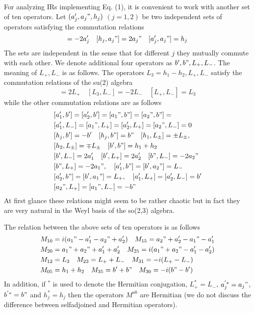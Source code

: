 \documentclass[a4paper,12pt]{article}%
\begin{document}
For analyzing IRs implementing Eq. (1), it is convenient to
work with another set of ten operators. Let $(a_j',a_j",h_j)$ 
$(j=1,2)$ be two independent sets of operators satisfying the 
commutation relations 
\begin{equation}
[h_j,a_j']=-2a_j'\quad [h_j,a_j"]=2a_j"\quad [a_j',a_j"]=h_j
\label{2}
\end{equation}
The sets are independent in the sense that
for different $j$ they mutually commute with each other. 
We denote additional four operators as $b', b",L_+,L_-$.
The meaning of $L_+,L_-$ is as follows. The operators 
$L_3=h_1-h_2,L_+,L_-$ satisfy the commutation relations
of the su(2) algebra
\begin{equation}
[L_3,L_+]=2L_+\quad [L_3,L_-]=-2L_-\quad [L_+,L_-]=L_3
\label{3}
\end{equation}
while the other commutation relations are as follows
\begin{eqnarray}
&[a_1',b']=[a_2',b']=[a_1",b"]=[a_2",b"]=\nonumber\\
&[a_1',L_-]=[a_1",L_+]=[a_2',L_+]=[a_2",L_-]=0\nonumber\\
&[h_j,b']=-b'\quad [h_j,b"]=b"\quad 
[h_1,L_{\pm}]=\pm L_{\pm},\nonumber\\
&[h_2,L_{\pm}]=\mp L_{\pm}\quad [b',b"]=h_1+h_2\nonumber\\
&[b',L_-]=2a_1'\quad [b',L_+]=2a_2'\quad [b",L_-]=-2a_2"\nonumber\\
&[b",L_+]=-2a_1",\quad [a_1',b"]=[b',a_2"]=L_-\nonumber\\
&[a_2',b"]=[b',a_1"]=L_+,\quad [a_1',L_+]=[a_2',L_-]=b'\nonumber\\
&[a_2",L_+]=[a_1",L_-]=-b"
\label{4}
\end{eqnarray}  
At first glance these relations might seem to be rather 
chaotic but in fact they are very natural in the Weyl basis
of the so(2,3) algebra. 

The relation between the above sets of ten operators is as follows
\begin{eqnarray}
&M_{10}=i(a_1"-a_1'-a_2"+a_2')\quad M_{15}=a_2"+a_2'-a_1"-a_1'\nonumber\\
&M_{20}=a_1"+a_2"+a_1'+a_2'\quad M_{25}=i(a_1"+a_2"-a_1'-a_2')\nonumber\\
&M_{12}=L_3\quad M_{23}=L_++L_-\quad M_{31}=-i(L_+-L_-)\nonumber\\
&M_{05}=h_1+h_2\quad M_{35}=b'+b"\quad M_{30}=-i(b"-b')
\label{5}
\end{eqnarray}
In addition, if $^*$ is used to denote the Hermitian conjugation,
$L_+^*=L_-$, $a_j^{'*}=a_j"$, $b^{'*}=b"$ and $h_j^*=h_j$ then
the operators $M^{ab}$ are Hermitian (we do not discuss the
difference between selfadjoined and Hermitian operators).   
\end{document}
